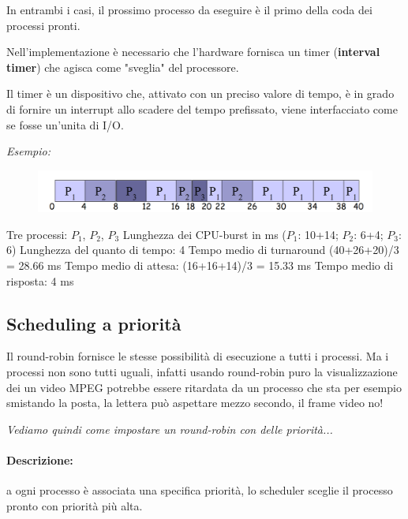 In entrambi i casi, il prossimo processo da eseguire è il primo della coda dei processi pronti.
\newline

Nell'implementazione è necessario che l'hardware fornisca un timer (\textbf{interval timer}) che agisca come "sveglia" del processore.

Il timer è un dispositivo che, attivato con un preciso valore di tempo, è in grado di fornire un interrupt allo scadere del tempo prefissato, viene interfacciato come se fosse un'unita di I/O.
\newline

\textit{Esempio:}

\begin{figure} [h]
    \centering
    \includegraphics[width=0.5\linewidth]{Images/Screenshot 2024-12-23 at 15-06-19 so-02.1-scheduling - so-02.1-scheduling.pdf.png}
    \caption{}
\end{figure}

Tre processi: $P_1$, $P_2$, $P_3$
\newline
Lunghezza dei CPU-burst in ms ($P_1$: 10+14; $P_2$: 6+4; $P_3$: 6)
\newline
Lunghezza del quanto di tempo: 4
\newline
Tempo medio di turnaround (40+26+20)/3 = 28.66 ms
\newline
Tempo medio di attesa: (16+16+14)/3 = 15.33 ms
\newline
Tempo medio di risposta: 4 ms

\subsection{Scheduling a priorità}

Il round-robin fornisce le stesse possibilità di esecuzione a tutti i processi. 
Ma i processi non sono tutti uguali, infatti usando round-robin puro la visualizzazione dei un video MPEG potrebbe essere ritardata da un processo che sta per esempio smistando la posta, la lettera può aspettare mezzo secondo, il frame video no!

\textit{Vediamo quindi come impostare un round-robin con delle priorità...}

\paragraph{Descrizione:} a ogni processo è associata una specifica priorità, lo scheduler sceglie il processo pronto con priorità più alta.
\newline

